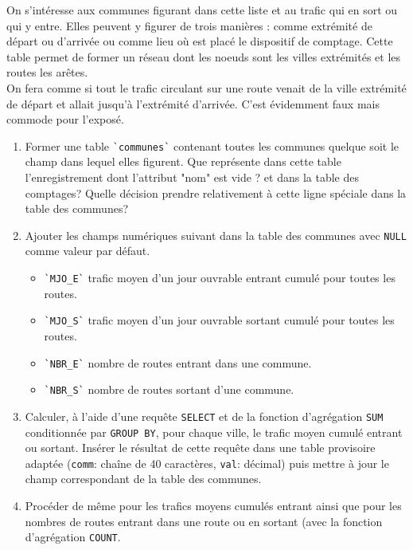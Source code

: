 On s'intéresse aux communes figurant dans cette liste et au trafic qui en sort ou qui y entre. Elles peuvent y figurer de trois manières : comme extrémité de départ ou d'arrivée ou comme lieu où est placé le dispositif de comptage.\newline
Cette table permet de former un réseau dont les noeuds sont les villes extrémités et les routes les arêtes.\\
On fera comme si tout le trafic circulant sur une route venait de la ville extrémité de départ et allait jusqu'à l'extrémité d'arrivée. C'est évidemment faux mais commode pour l'exposé.
\begin{enumerate}
  \item Former une table \verb|`communes`| contenant toutes les communes quelque soit le champ dans lequel elles figurent. Que représente dans cette table l'enregistrement dont l'attribut "nom" est vide ? et dans la table des comptages? Quelle décision prendre relativement à cette ligne spéciale dans la table des communes?
  \item Ajouter les champs numériques suivant dans la table des communes avec \verb|NULL| comme valeur par défaut. 
\begin{itemize}
  \item \verb|`MJO_E`| trafic moyen d'un jour ouvrable entrant cumulé pour toutes les routes.
  \item \verb|`MJO_S`| trafic moyen d'un jour ouvrable sortant cumulé pour toutes les routes.
  \item \verb|`NBR_E`| nombre de routes entrant dans une commune.
  \item \verb|`NBR_S`| nombre de routes sortant d'une commune.
\end{itemize}

  \item Calculer, à l'aide d'une requête \verb|SELECT| et de la fonction d'agrégation \verb|SUM| conditionnée par \verb|GROUP BY|, pour chaque ville, le trafic moyen cumulé entrant ou sortant. Insérer le résultat de cette requête dans une table provisoire adaptée (\verb|comm|: chaîne de 40 caractères, \verb|val|: décimal) puis mettre à jour le champ correspondant de la table des communes.

  \item Procéder de même pour les trafics moyens cumulés entrant ainsi que pour les nombres de routes entrant dans une route ou en sortant (avec la fonction d'agrégation \verb|COUNT|. 
  

\end{enumerate}
